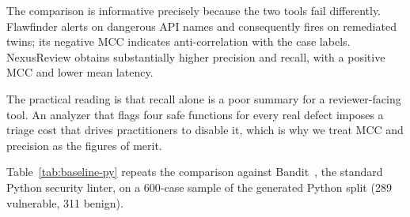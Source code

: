 \documentclass[10pt,conference]{IEEEtran}
\begin{document}
\begin{table}[t]
\centering
\caption{RQ4: comparison on an identical 2{,}000-function sample of the
in-scope Juliet set (seed 42; 485 vulnerable, 1{,}515 benign), case level,
both tools executed by us. Flawfinder runs its default profile and is scored
with line-only matching, which favours it.}
\label{tab:baseline}
\end{table}

The comparison is informative precisely because the two tools fail
differently. Flawfinder alerts on dangerous API names and consequently fires
on remediated twins; its negative MCC indicates anti-correlation with the
case labels. NexusReview obtains substantially higher precision and recall,
with a positive MCC and lower mean latency.

The practical reading is that recall alone is a poor summary for a
reviewer-facing tool. An analyzer that flags four safe functions for every
real defect imposes a triage cost that drives practitioners to disable it,
which is why we treat MCC and precision as the figures of merit.

Table~\ref{tab:baseline-py} repeats the comparison against
Bandit~\cite{bandit}, the standard Python security linter, on a 600-case
sample of the generated Python split (289 vulnerable, 311 benign).

\begin{table}[t]
\centering
\caption{RQ4: comparison with Bandit on an identical 600-case Python sample
(seed 42), case level, both tools executed by us under the same protocol.}
\label{tab:baseline-py}
\end{table}
\end{document}
